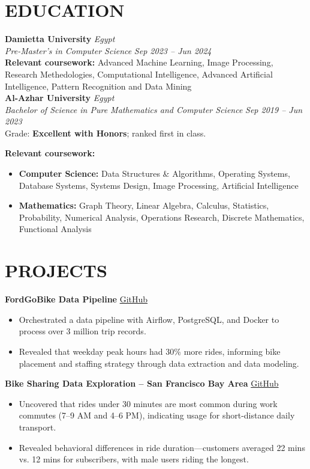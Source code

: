 \documentclass[11pt]{article}
\begin{document}
\section{EDUCATION}

\textbf{Damietta University} \hfill \textit{Egypt} \\
\textit{Pre-Master’s in Computer Science} \hfill \textit{Sep 2023 – Jun 2024} \\
\textbf{Relevant coursework:} Advanced Machine Learning, Image Processing, Research Methedologies, Computational Intelligence, Advanced Artificial Intelligence, Pattern Recognition and Data Mining\\

\textbf{Al-Azhar University} \hfill \textit{Egypt} \\
\textit{Bachelor of Science in Pure Mathematics and Computer Science} \hfill \textit{Sep 2019 – Jun 2023} \\
 Grade: \textbf{Excellent with Honors}; ranked first in class. 

 \textbf{Relevant coursework:}
  \begin{itemize}
    \item \textbf{Computer Science:} Data Structures \& Algorithms, Operating Systems, Database Systems, Systems Design, Image Processing, Artificial Intelligence
    \item \textbf{Mathematics:} Graph Theory, Linear Algebra, Calculus, Statistics, Probability, Numerical Analysis, Operations Research, Discrete Mathematics, Functional Analysis\\
  \end{itemize}


\section{PROJECTS}

\textbf{FordGoBike Data Pipeline} \hfill \href{https://github.com/Mostafa-Elnagar/FordGoBike-data-pipeline}{GitHub}
\begin{itemize}
  \item Orchestrated a data pipeline with Airflow, PostgreSQL, and Docker to process over 3 million trip records.
  \item Revealed that weekday peak hours had 30\% more rides, informing bike placement and staffing strategy through data extraction and data modeling.\\
\end{itemize}

\textbf{Bike Sharing Data Exploration – San Francisco Bay Area} \hfill \href{https://github.com/Mostafa-Elnagar/bikesharing_project}{GitHub}
\begin{itemize}
\item Uncovered that rides under 30 minutes are most common during work commutes (7–9 AM and 4–6 PM), indicating usage for short-distance daily transport.
\item Revealed behavioral differences in ride duration—customers averaged 22 mins vs. 12 mins for subscribers, with male users riding the longest.\\
\end{itemize}
\end{document}
